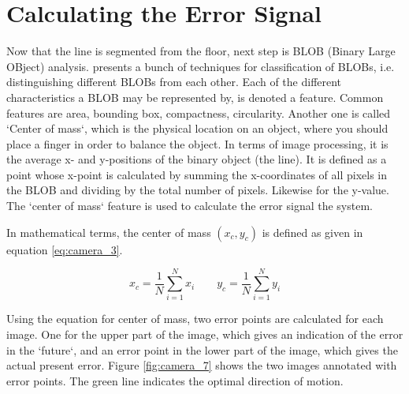 
%
%
%
%
\section{Calculating the Error Signal}

Now that the line is segmented from the floor, next step is BLOB (Binary Large OBject) analysis. \citep{moeslund2009} presents a bunch of techniques for classification of BLOBs, i.e. distinguishing different BLOBs from each other. Each of the different characteristics a BLOB may be represented by, is denoted a feature. Common features are area, bounding box, compactness, circularity. Another one is called `Center of mass`, which is the physical location on an object, where you should place a finger in order to balance the object. In terms of image processing, it is the average x- and y-positions of the binary object (the line). It is defined as a point whose x-point is calculated by summing the x-coordinates of all pixels in the BLOB and dividing by the total number of pixels. Likewise for the y-value. The `center of mass` feature is used to calculate the error signal the system.

In mathematical terms, the center of mass $(x_c, y_c)$ is defined as given in equation \ref{eq:camera_3}.


\begin{equation}\label{eq:camera_3}
	x_c = \frac{1}{N} \sum_{i = 1}^{N}{x_i} \quad \quad y_c = \frac{1}{N} \sum_{i = 1}^{N}{y_i} 
\end{equation}

Using the equation for center of mass, two error points are calculated for each image. One for the upper part of the image, which gives an indication of the error in the `future`, and an error point in the lower part of the image, which gives the actual present error. Figure \ref{fig:camera_7} shows the two images annotated with error points. The green line indicates the optimal direction of motion.

